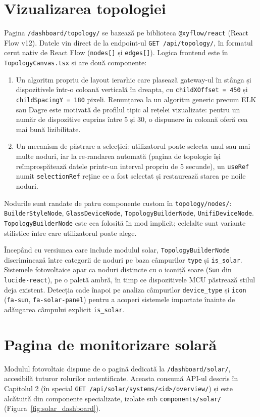 \section{Vizualizarea topologiei}
Pagina \texttt{/dashboard/topology/} se bazează pe biblioteca \texttt{@xyflow/react} (React Flow v12). Datele vin direct de la endpoint-ul \texttt{GET /api/topology/}, în formatul cerut nativ de React Flow (\texttt{nodes[]} și \texttt{edges[]}). Logica frontend este în \texttt{TopologyCanvas.tsx} și are două componente:

\begin{enumerate}
    \item Un algoritm propriu de layout ierarhic care plasează gateway-ul în stânga și dispozitivele într-o coloană verticală în dreapta, cu \texttt{childXOffset = 450} și \texttt{childSpacingY = 180} pixeli. Renunțarea la un algoritm generic precum ELK sau Dagre este motivată de profilul tipic al rețelei vizualizate: pentru un număr de dispozitive cuprins între 5 și 30, o dispunere în coloană oferă cea mai bună lizibilitate.
    \item Un mecanism de păstrare a selecției: utilizatorul poate selecta unul sau mai multe noduri, iar la re-randarea automată (pagina de topologie își reîmprospătează datele printr-un interval propriu de 5 secunde), un \texttt{useRef} numit \texttt{selectionRef} reține ce a fost selectat și restaurează starea pe noile noduri.
\end{enumerate}

Nodurile sunt randate de patru componente custom în \texttt{topology/nodes/}: \texttt{BuilderStyleNode}, \texttt{GlassDeviceNode}, \texttt{TopologyBuilderNode}, \texttt{UnifiDeviceNode}. \texttt{TopologyBuilderNode} este cea folosită în mod implicit; celelalte sunt variante stilistice între care utilizatorul poate alege.

Începând cu versiunea care include modulul solar, \texttt{TopologyBuilderNode} discriminează între categorii de noduri pe baza câmpurilor \texttt{type} și \texttt{is\_solar}. Sistemele fotovoltaice apar ca noduri distincte cu o iconiță soare (\texttt{Sun} din \texttt{lucide-react}), pe o paletă ambră, în timp ce dispozitivele MCU păstrează stilul deja existent. Detecția cade înapoi pe analiza câmpurilor \texttt{device\_type} și \texttt{icon} (\texttt{fa-sun}, \texttt{fa-solar-panel}) pentru a acoperi sistemele importate înainte de adăugarea câmpului explicit \texttt{is\_solar}.

\section{Pagina de monitorizare solară}
Modulul fotovoltaic dispune de o pagină dedicată la \texttt{/dashboard/solar/}, accesibilă tuturor rolurilor autentificate. Aceasta consumă API-ul descris în Capitolul 2 (în special \texttt{GET /api/solar/systems/<id>/overview/}) și este alcătuită din componente specializate, izolate sub \texttt{components/solar/} (Figura~\ref{fig:solar_dashboard}).

